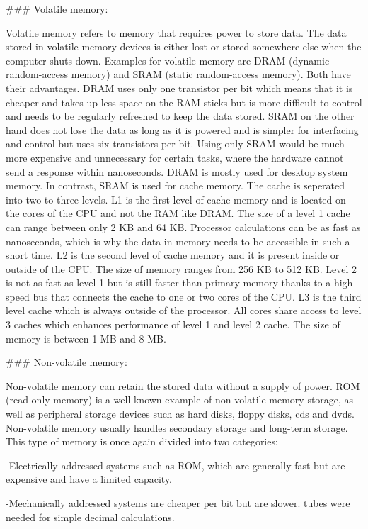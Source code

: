 ### Volatile memory:

Volatile memory refers to memory that requires power to store data. The data stored in volatile memory
devices is either lost or stored somewhere else when the computer shuts down. Examples for volatile 
memory are DRAM (dynamic random-access memory) and SRAM (static random-access memory). Both have their
advantages. DRAM uses only one transistor per bit which means that it is cheaper and takes up less 
space on the RAM sticks but is more difficult to control and needs to be regularly refreshed to keep
the data stored. SRAM on the other hand does not lose the data as long as it is powered and is simpler for interfacing
and control but uses six transistors per bit. Using only SRAM would be much more expensive and unnecessary for 
certain tasks, where the hardware cannot send a response within nanoseconds. DRAM is mostly used for desktop system memory. 
In contrast, SRAM is used for cache memory. The cache is seperated into two to three levels. 
L1 is the first level of cache memory and is located on the cores of the CPU and not the RAM like DRAM. The 
size of a level 1 cache can range between only 2 KB and 64 KB. Processor calculations can be as fast as nanoseconds, which
is why the data in memory needs to be accessible in such a short time. L2 is the second level of cache memory
and it is present inside or outside of the CPU. The size of memory ranges from 256 KB to 512 KB.
Level 2 is not as fast as level 1 but is still faster than primary memory thanks to a high-speed bus
that connects the cache to one or two cores of the CPU. L3 is the third level cache which is always outside
of the processor. All cores share access to level 3 caches which enhances performance of level 1 and
level 2 cache. The size of memory is between 1 MB and 8 MB.

### Non-volatile memory:

Non-volatile memory can retain the stored data without a supply of power. ROM (read-only memory) is a well-known
example of non-volatile memory storage, as well as peripheral storage devices such as hard disks, floppy disks, cds and 
dvds. Non-volatile memory usually handles secondary storage and long-term storage. This type of memory is once again
divided into two categories:

-Electrically addressed systems such as ROM, which are generally fast but are expensive and
have a limited capacity. 

-Mechanically addressed systems are cheaper per bit but are slower. 
tubes were needed for simple decimal calculations. 


